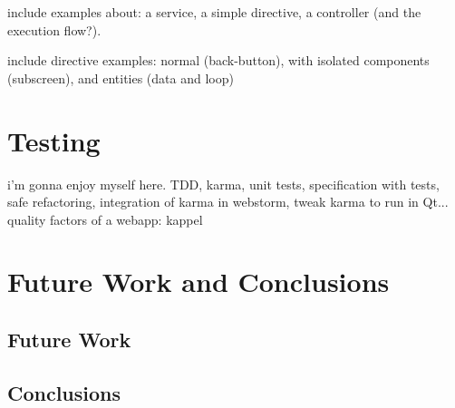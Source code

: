 include examples about: a service, a simple directive, a controller (and the execution flow?).

include directive examples: normal (back-button), with isolated components (subscreen), and entities (data and loop)

\chapter{Testing}
i'm gonna enjoy myself here.
TDD, karma, unit tests, specification with tests, safe refactoring, integration of karma in webstorm, tweak karma to run in Qt...
quality factors of a webapp: kappel


\chapter{Future Work and Conclusions}
\section{Future Work}
\section{Conclusions}